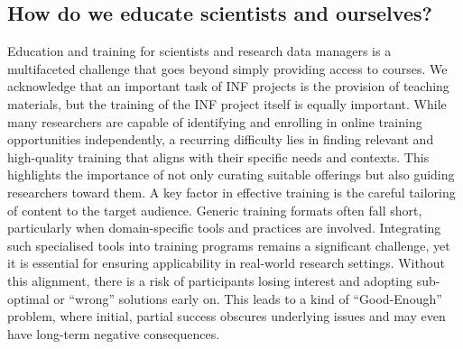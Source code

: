 \documentclass{eceasst}
\begin{document}
\subsection{How do we educate scientists and ourselves?}
Education and training for scientists and research data managers is a multifaceted challenge that goes beyond simply providing access to courses.
We acknowledge that an important task of INF projects is the provision of teaching materials, but the training of the INF project itself is equally important.
While many researchers are capable of identifying and enrolling in online training opportunities independently, a recurring difficulty lies in finding relevant and high-quality training that aligns with their specific needs and contexts.
This highlights the importance of not only curating suitable offerings but also guiding researchers toward them.
A key factor in effective training is the careful tailoring of content to the target audience.
Generic training formats often fall short, particularly when domain-specific tools and practices are involved.
Integrating such specialised tools into training programs remains a significant challenge,
yet it is essential for ensuring applicability in real-world research settings.
Without this alignment, there is a risk of participants losing interest and adopting sub-optimal or ``wrong'' solutions early on. This leads to a kind of ``Good-Enough'' problem,
where initial, partial success obscures underlying issues and may even have long-term negative consequences.
\end{document}
